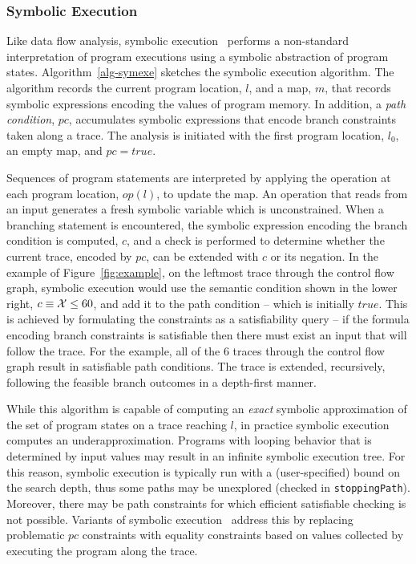 \subsubsection{Symbolic Execution}
Like data flow analysis, symbolic execution~\cite{king1976symbolic,clarke1976system} 
performs a non-standard interpretation of program executions using 
a symbolic abstraction of program states.
Algorithm~\ref{alg-symexe} sketches the symbolic execution algorithm.
The algorithm records the current program location, $l$,
and a map, $m$, that records symbolic expressions encoding the
values of program memory.  In addition, a \textit{path condition}, $pc$,
accumulates symbolic expressions that encode branch constraints 
taken along a trace.  The analysis is initiated with the first
program location, $l_0$, an empty map, and $pc = true$.

Sequences of program statements are interpreted by applying the operation
at each program location, $op(l)$, to update the map.  
An operation that reads from an input generates a fresh symbolic
variable which is unconstrained.  
When a branching statement is encountered, the symbolic expression encoding
the branch condition is computed, $c$, and a check is performed
to determine whether the current trace, encoded by $pc$, can be
extended with $c$ or its negation.  
In the example of Figure~\ref{fig:example}, on the leftmost trace through
the control flow graph, symbolic execution would use the semantic
condition shown in the lower right, $c \equiv {\cal X} \le 60$,
and add it to the path condition -- which is initially $true$.
This is achieved by formulating the constraints
as a satisfiability query -- if the formula encoding branch constraints
is satisfiable then there must exist an input that will follow the trace.
For the example, all of the 6 traces through the control flow graph 
result in satisfiable path conditions.
The trace is extended, recursively, following the feasible branch outcomes
in a depth-first manner.

While this algorithm is capable of computing an \textit{exact} symbolic
approximation of the set of program states on a trace reaching $l$, in
practice symbolic execution computes an underapproximation.
Programs with looping behavior that is determined by input values 
may result in an infinite symbolic execution tree. 
For this reason, symbolic execution is
typically run with a (user-specified) bound on the search depth, thus
some paths may be unexplored (checked in {\tt stoppingPath}).   Moreover, there may be path constraints
for which efficient satisfiable checking is not possible.  Variants of
symbolic execution~\cite{godefroid2005dart,sen2005cute,song2008bitblaze} 
address this by replacing problematic $pc$ constraints with equality
constraints based on values collected by executing the program along the trace.

